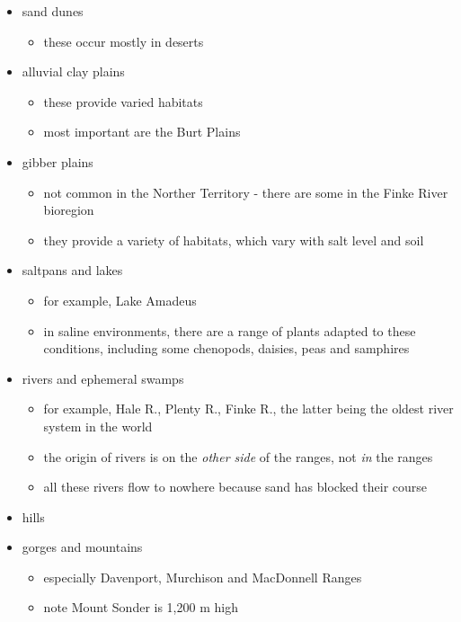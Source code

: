 \documentclass[
]{article}
\providecommand{\tightlist}{%
  \setlength{\itemsep}{0pt}\setlength{\parskip}{0pt}}
\begin{document}
\begin{itemize}
\item
  sand dunes

  \begin{itemize}
  \tightlist
  \item
    these occur mostly in deserts
  \end{itemize}
\item
  alluvial clay plains

  \begin{itemize}
  \tightlist
  \item
    these provide varied habitats
  \item
    most important are the Burt Plains
  \end{itemize}
\item
  gibber plains

  \begin{itemize}
  \tightlist
  \item
    not common in the Norther Territory - there are some in the Finke
    River bioregion
  \item
    they provide a variety of habitats, which vary with salt level and
    soil
  \end{itemize}
\item
  saltpans and lakes

  \begin{itemize}
  \tightlist
  \item
    for example, Lake Amadeus
  \item
    in saline environments, there are a range of plants adapted to these
    conditions, including some chenopods, daisies, peas and samphires
  \end{itemize}
\item
  rivers and ephemeral swamps

  \begin{itemize}
  \tightlist
  \item
    for example, Hale R., Plenty R., Finke R., the latter being the
    oldest river system in the world
  \item
    the origin of rivers is on the \emph{other side} of the ranges, not
    \emph{in} the ranges
  \item
    all these rivers flow to nowhere because sand has blocked their
    course
  \end{itemize}
\item
  hills
\item
  gorges and mountains

  \begin{itemize}
  \tightlist
  \item
    especially Davenport, Murchison and MacDonnell Ranges
  \item
    note Mount Sonder is 1,200 m high
  \end{itemize}
\end{itemize}
\end{document}
